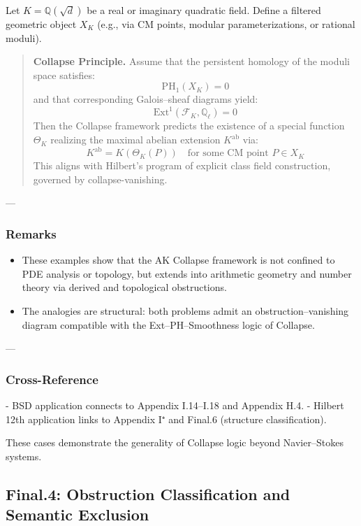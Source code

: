 \documentclass[11pt]{article}
\begin{document}
\begin{axiom}
\begin{axiom}
{{Let \( K = \mathbb{Q}(\sqrt{d}) \) be a real or imaginary quadratic field.  
Define a filtered geometric object \( X_K \) (e.g., via CM points, modular parameterizations, or rational moduli).

\begin{quote}
\textbf{Collapse Principle.}  
Assume that the persistent homology of the moduli space satisfies:
\[
\mathrm{PH}_1(X_K) = 0
\]
and that corresponding Galois–sheaf diagrams yield:
\[
\mathrm{Ext}^1(\mathcal{F}_K, \mathbb{Q}_\ell) = 0
\]
Then the Collapse framework predicts the existence of a special function \( \Theta_K \)  
realizing the maximal abelian extension \( K^{\mathrm{ab}} \) via:
\[
K^{\mathrm{ab}} = K(\Theta_K(P)) \quad \text{for some CM point } P \in X_K
\]
This aligns with Hilbert’s program of explicit class field construction, governed by collapse-vanishing.
\end{quote}

---

\subsubsection*{Remarks}

\begin{itemize}
  \item These examples show that the AK Collapse framework is not confined to PDE analysis or topology,  
  but extends into arithmetic geometry and number theory via derived and topological obstructions.
  \item The analogies are structural: both problems admit an obstruction–vanishing diagram  
  compatible with the Ext–PH–Smoothness logic of Collapse.
\end{itemize}

---

\subsubsection*{Cross-Reference}

- BSD application connects to Appendix I.14–I.18 and Appendix H.4.
- Hilbert 12th application links to Appendix I⁺ and Final.6 (structure classification).

These cases demonstrate the generality of Collapse logic beyond Navier–Stokes systems.



\subsection*{Final.4: Obstruction Classification and Semantic Exclusion}

}}
\end{axiom}
\end{axiom}
\end{document}
